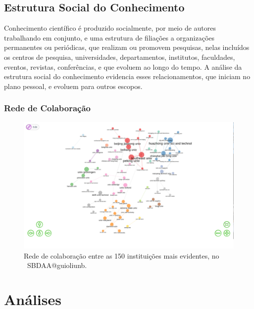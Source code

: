 \subsection{Estrutura Social do Conhecimento}

Conhecimento científico é produzido socialmente, por meio de autores trabalhando em conjunto, e uma estrutura de filiações a organizações permanentes ou periódicas, que realizam ou promovem pesquisas, nelas incluídos os centros de pesquisa, universidades, departamentos, institutos, faculdades, eventos, revistas, conferências, e que evoluem ao longo do tempo. A análise da estrutura social do conhecimento evidencia esses relacionamentos, que iniciam no plano pessoal, e evoluem para outros escopos.

\subsubsection{Rede de Colaboração}






\begin{figure}
    \centering
    \includegraphics[width=1\textwidth]{experiments/jhcf/PesqBibliogr/SimulacaoMultiagente/WoS-20220203/Estrutura/Social/MASSA2-Collaboration-Network-150instit.png}
    \caption{Rede de colaboração entre as 150 instituições mais evidentes, no  \dataset\ SBDAA@guioliunb.}
    \label{fig:MASSA2-Collaboration-Network-150instit}
\end{figure}


\section{Análises\label{MASSA2:Analises}}

